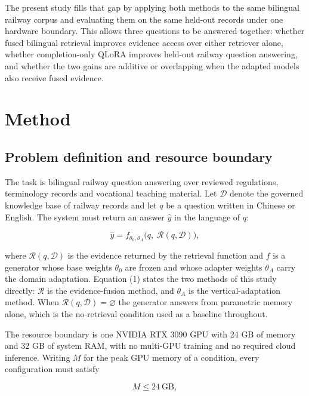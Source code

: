 \documentclass{article}
\begin{document}
The present study fills that gap by applying both methods to the same bilingual railway corpus and evaluating them on the same held-out records under one hardware boundary. This allows three questions to be answered together: whether fused bilingual retrieval improves evidence access over either retriever alone, whether completion-only QLoRA improves held-out railway question answering, and whether the two gains are additive or overlapping when the adapted models also receive fused evidence.

\section{Method}

\subsection{Problem definition and resource boundary}

The task is bilingual railway question answering over reviewed regulations, terminology records and vocational teaching material. Let $\mathcal{D}$ denote the governed knowledge base of railway records and let $q$ be a question written in Chinese or English. The system must return an answer $\hat{y}$ in the language of $q$:

\begin{equation}
\hat{y}=f_{\theta_0,\theta_A}\big(q,\;\mathcal{R}(q,\mathcal{D})\big),
\end{equation}

where $\mathcal{R}(q,\mathcal{D})$ is the evidence returned by the retrieval function and $f$ is a generator whose base weights $\theta_0$ are frozen and whose adapter weights $\theta_A$ carry the domain adaptation. Equation (1) states the two methods of this study directly: $\mathcal{R}$ is the evidence-fusion method, and $\theta_A$ is the vertical-adaptation method. When $\mathcal{R}(q,\mathcal{D})=\varnothing$ the generator answers from parametric memory alone, which is the no-retrieval condition used as a baseline throughout.

The resource boundary is one NVIDIA RTX 3090 GPU with 24 GB of memory and 32 GB of system RAM, with no multi-GPU training and no required cloud inference. Writing $M$ for the peak GPU memory of a condition, every configuration must satisfy

\begin{equation}
M \le 24\ \text{GB},
\end{equation}
\end{document}
